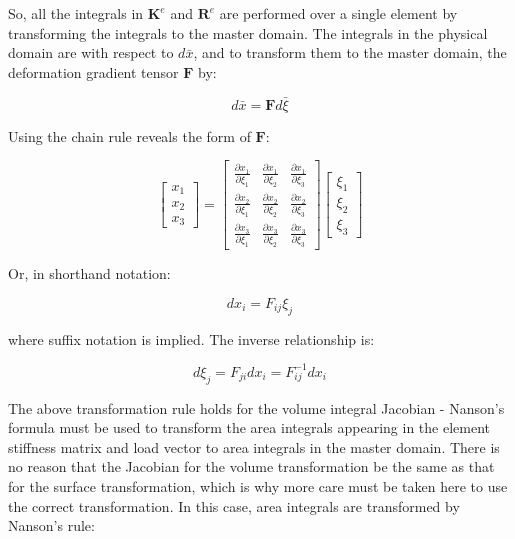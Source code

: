 \documentclass[10pt]{article}
\begin{document}
So, all the integrals in \(\textbf{K}^e\) and \(\textbf{R}^e\) are performed over a single element by transforming the integrals to the master domain. The integrals in the physical domain are with respect to \(d\bar{x}\), and to transform them to the master domain, the deformation gradient tensor \(\textbf{F}\) by:

\begin{equation}
d\bar{x}=\textbf{F}d\bar{\xi}
\end{equation}

Using the chain rule reveals the form of \(\textbf{F}\):

\begin{equation}
\label{eq:FForm}
\begin{bmatrix}x_1\\x_2\\x_3\end{bmatrix}=
\begin{bmatrix}\frac{\partial x_1}{\partial \xi_1}&\frac{\partial x_1}{\partial \xi_2}&\frac{\partial x_1}{\partial \xi_3}\\
\frac{\partial x_2}{\partial \xi_1}&\frac{\partial x_2}{\partial \xi_2}&\frac{\partial x_2}{\partial \xi_3}\\
\frac{\partial x_3}{\partial \xi_1}&\frac{\partial x_3}{\partial \xi_2}&\frac{\partial x_3}{\partial \xi_3}\end{bmatrix}
\begin{bmatrix}\xi_1\\\xi_2\\\xi_3\end{bmatrix}
\end{equation}

Or, in shorthand notation:

\begin{equation}
dx_i=F_{ij}\xi_j
\end{equation}

where suffix notation is implied. The inverse relationship is:

\begin{equation}
d\xi_j=F_{ji}dx_i=F_{ij}^{-1}dx_i
\end{equation}


The above transformation rule holds for the volume integral Jacobian - Nanson's formula must be used to transform the area integrals appearing in the element stiffness matrix and load vector to area integrals in the master domain. There is no reason that the Jacobian for the volume transformation be the same as that for the surface transformation, which is why more care must be taken here to use the correct transformation. In this case, area integrals are transformed by Nanson's rule:
\end{document}
